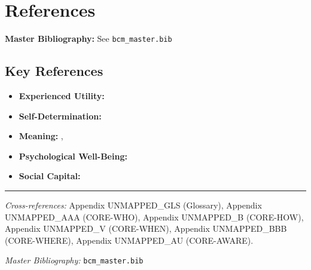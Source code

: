 \section{References}
\label{sec:what-references}

\begin{tcolorbox}[colback=blue!5!white, colframe=blue!75!black]
\textbf{Master Bibliography:} See \texttt{bcm\_master.bib}
\end{tcolorbox}

\subsection{Key References}

\begin{itemize}[nosep]
\item \textbf{Experienced Utility:} \citet{kahneman1999wellbeing}
\item \textbf{Self-Determination:} \citet{ryan2000self}
\item \textbf{Meaning:} \citet{frankl1959search}, \citet{steger2006meaning}
\item \textbf{Psychological Well-Being:} \citet{ryff1989happiness}
\item \textbf{Social Capital:} \citet{putnam2000bowling}
\end{itemize}

\nocite{bcm_master}


\vspace{1em}
\hrule
\vspace{0.5em}

\noindent\textit{Cross-references:}
Appendix UNMAPPED_GLS (Glossary),
Appendix UNMAPPED_AAA (CORE-WHO),
Appendix UNMAPPED_B (CORE-HOW),
Appendix UNMAPPED_V (CORE-WHEN),
Appendix UNMAPPED_BBB (CORE-WHERE),
Appendix UNMAPPED_AU (CORE-AWARE).

\noindent\textit{Master Bibliography:} \texttt{bcm\_master.bib}

